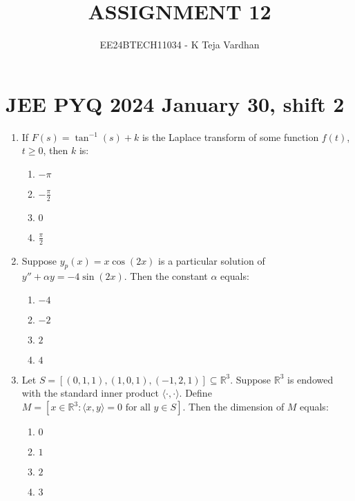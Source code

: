 \documentclass[journal]{IEEEtran}
\newcommand{\brak}[1]{\left( #1 \right)}
\newcommand{\sbrak}[1]{\left[ #1 \right]}
\begin{document}

\title{ASSIGNMENT 12}
\author{EE24BTECH11034 - K Teja Vardhan}
{\let\newpage\relax\maketitle}

\section{JEE PYQ 2024 January 30, shift 2}
\begin{enumerate}

  \item If $F\brak{s} = \tan^{-1}\brak{s} + k$ is the Laplace transform of some function $f\brak{t}$, $t \geq 0$, then $k$ is:
    
    \begin{multicols}{4}
    \begin{enumerate}
        \item $-\pi$
        \item $-\frac{\pi}{2}$
        \item $0$
        \item $\frac{\pi}{2}$
    \end{enumerate}
    \end{multicols}

  \item Suppose $y_p\brak{x} = x \cos\brak{2x}$ is a particular solution of $y'' + \alpha y = -4 \sin\brak{2x}$. Then the constant $\alpha$ equals:
    
    \begin{multicols}{4}
    \begin{enumerate}
        \item $-4$
        \item $-2$
        \item $2$
        \item $4$
    \end{enumerate}
    \end{multicols}

  \item Let $S = \sbrak{\brak{0,1,1}, \brak{1,0,1}, \brak{-1,2,1}} \subseteq \mathbb{R}^3$. Suppose $\mathbb{R}^3$ is endowed with the standard inner product $\langle \cdot, \cdot \rangle$. Define $M = \sbrak{x \in \mathbb{R}^3 : \langle x, y \rangle = 0 \text{ for all } y \in S}$. Then the dimension of $M$ equals:

    \begin{multicols}{4}
    \begin{enumerate}
        \item $0$
        \item $1$
        \item $2$
        \item $3$
    \end{enumerate}
    \end{multicols}


\end{enumerate}
\end{document}
